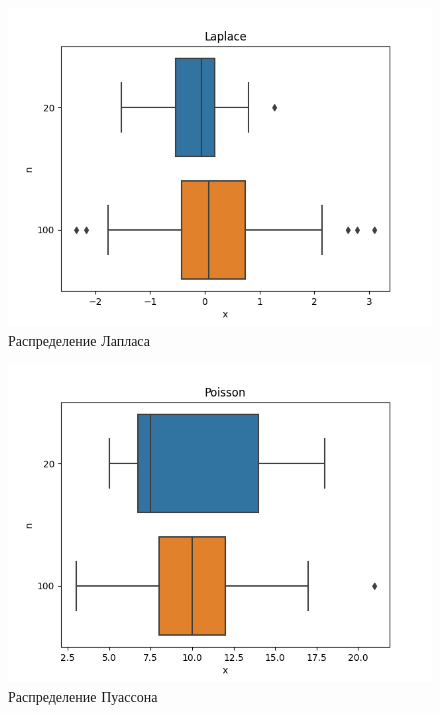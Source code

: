 \documentclass[12pt]{article}
\begin{document}
\begin{figure}
  \centering
  \includegraphics[width=0.4\paperwidth ]{../images/boxplots/Laplace.png}
  \caption{Распределение Лапласа}
\end{figure}

\begin{figure}
  \centering
  \includegraphics[width=0.4\paperwidth ]{../images/boxplots/Poisson.png}
  \caption{Распределение Пуассона}
\end{figure}
\end{document}
